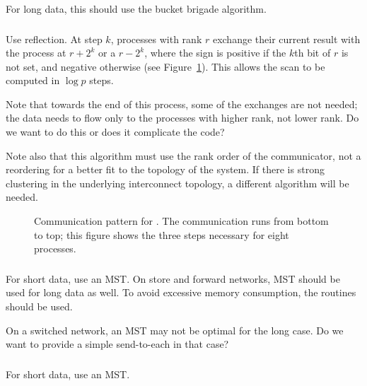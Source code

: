 \documentclass{article}
\begin{document}
For long data, this should use the bucket brigade algorithm.

\subsubsection{}
Use reflection.  At step $k$, processes with rank $r$ exchange their current
result with the process at $r+2^k$ or a $r-2^k$, where the sign is positive if
the $k$th bit of $r$ is not set, and negative otherwise (see
Figure~\ref{fig:scan-pattern}).  This allows the scan 
to be computed in $\log p$ steps.  

Note that towards the end of this process, some of the exchanges are not
needed; the data needs to flow only to the processes with higher rank, not
lower rank.  Do we want to do this or does it complicate the code?

Note also that this algorithm must use the rank order of the communicator, not
a reordering for a better fit to the topology of the system.  If there is
strong clustering in the underlying interconnect topology, a different
algorithm will be needed.

\begin{figure}
\centerline{}
\caption{Communication pattern for .  The communication
runs from bottom to top; this figure shows the three steps necessary for
eight processes.}\label{fig:scan-pattern}
\end{figure}

\subsubsection{}
For short data, use an MST. On store and forward networks, MST should be used
for long data as well.  To avoid excessive memory consumption, the
 routines should be used.

On a switched network, an MST may not be optimal for the long case.  Do we
want to provide a simple send-to-each in that case?

\subsubsection{}
For short data, use an MST. 
\end{document}
